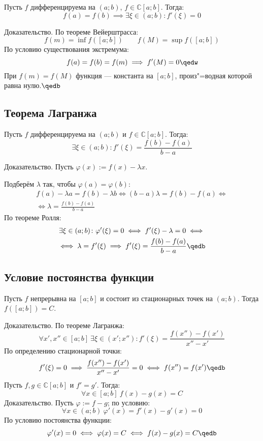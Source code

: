 \begin{theorem}
Пусть $f$ дифференцируема на $(a;b)$, $f\in\mathbb{C}[a;b]$. Тогда:
$$f(a)=f(b)\implies\exists\xi\in(a;b)\colon f'(\xi)=0$$
\end{theorem}
{\bold Доказательство.} По теореме Вейерштрасса:
$$f(m)=\inf f([a;b])\quad\quad f(M)=\sup f([a;b])$$
По условию существования экстремума:
$$f(a)=f(b)=f(m)\implies f'(M)=0\qedw$$
При $f(m)=f(M)$ функция --- константа на $[a;b]$, произ"=водная которой равна нулю.$\qedb$

\subsection{Теорема Лагранжа}

\begin{theorem}
Пусть $f$ дифференцируема на $(a;b)$ и $f\in\mathbb{C}[a;b]$. Тогда:
$$\exists\xi\in(a;b)\colon f'(\xi)=\frac{f(b)-f(a)}{b-a}$$
\end{theorem}
{\bold Доказательство.} Пусть $\varphi(x):=f(x)-\lambda x$.

Подберём $\lambda$ так, чтобы $\varphi(a)=\varphi(b)$:
\begin{gather*}
f(a)-\lambda a=f(b)-\lambda b\iff (b-a)\lambda=f(b)-f(a)\iff\\
\iff\lambda=\frac{f(b)-f(a)}{b-a}
\end{gather*}
По теореме Ролля:
\begin{gather*}
\exists\xi\in(a;b)\colon\varphi'(\xi)=0\iff f'(\xi)-\lambda=0\iff\\
\iff\lambda=f'(\xi)\implies f'(\xi)=\frac{f(b)-f(a)}{b-a}\qedb
\end{gather*}

\subsection{Условие постоянства функции}

\begin{theorem}
Пусть $f$ непрерывна на $[a;b]$ и состоит из стационарных точек на $(a;b)$. Тогда 
$f([a;b])=C$.
\end{theorem}
{\bold Доказательство.} По теореме Лагранжа:
$$\forall x',x''\in[a;b]\ \exists\xi\in(x';x'')\colon f'(\xi)=\frac{f(x'')-f(x')}{x''-x'}
$$
По определению стационарной точки:
$$f'(\xi)=0\implies \frac{f(x'')-f(x')}{x''-x'}=0\iff f(x'')=f(x')\qedb$$
Пусть $f,g\in\mathbb{C}[a;b]$ и $f'=g'$. Тогда:
$$\forall x\in[a;b]\ f(x)-g(x)=C$$
{\bold Доказательство.} Пусть $\varphi:=f-g$; по условию:
$$\forall x\in(a;b)\ \varphi'(x)=f'(x)-g'(x)=0$$
По условию постоянства функции:
$$\varphi'(x)=0\iff\varphi(x)=C\iff f(x)-g(x)=C\qedb$$
